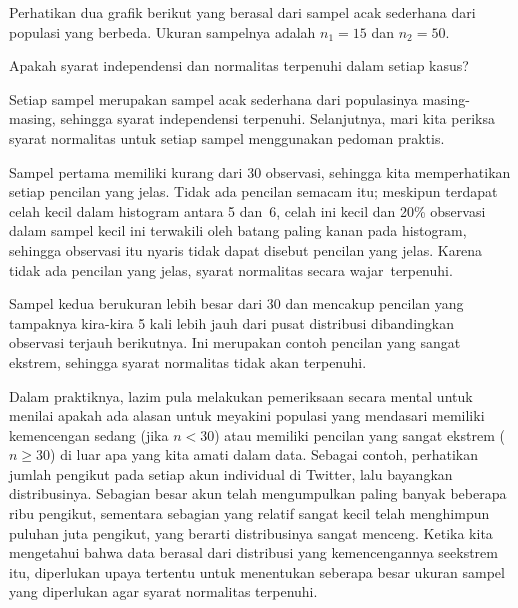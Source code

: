 \begin{examplewrap}
\begin{nexample}{Perhatikan dua grafik berikut
    yang berasal dari sampel acak sederhana dari
    populasi yang berbeda.
    Ukuran sampelnya adalah $n_1 = 15$ dan $n_2 = 50$.
    \begin{center}
    \end{center}
    Apakah syarat independensi dan normalitas terpenuhi
    dalam setiap kasus?}
  \label{outliers_and_ss_condition_ex}%
  Setiap sampel merupakan sampel acak sederhana dari
  populasinya masing-masing, sehingga syarat independensi
  terpenuhi.
  Selanjutnya, mari kita periksa syarat normalitas untuk
  setiap sampel menggunakan pedoman praktis.
  
  Sampel pertama memiliki kurang dari 30 observasi,
  sehingga kita memperhatikan setiap pencilan yang jelas.
  Tidak ada pencilan semacam itu; meskipun terdapat celah kecil dalam
  histogram antara 5 dan~6, celah ini kecil dan
  20\% observasi dalam sampel kecil ini
  terwakili oleh batang paling kanan pada histogram,
  sehingga observasi itu nyaris tidak dapat disebut pencilan yang jelas.
  Karena tidak ada pencilan yang jelas, syarat normalitas
  secara wajar~terpenuhi.

  Sampel kedua berukuran lebih besar dari 30 dan
  mencakup pencilan yang tampaknya kira-kira 5 kali
  lebih jauh dari pusat distribusi dibandingkan
  observasi terjauh berikutnya.
  Ini merupakan contoh pencilan yang sangat ekstrem,
  sehingga syarat normalitas tidak akan terpenuhi.
\end{nexample}
\end{examplewrap}

Dalam praktiknya, lazim pula melakukan pemeriksaan secara mental untuk menilai
apakah ada alasan untuk meyakini populasi yang mendasari
memiliki kemencengan sedang (jika $n < 30$)
atau memiliki pencilan yang sangat ekstrem ($n \geq 30$)
di luar apa yang kita amati dalam data.
Sebagai contoh, perhatikan jumlah pengikut
pada setiap akun individual di Twitter,
lalu bayangkan distribusinya.
Sebagian besar akun telah mengumpulkan
paling banyak beberapa ribu pengikut,
sementara sebagian yang relatif sangat kecil telah menghimpun
puluhan juta pengikut,
yang berarti distribusinya sangat menceng.
Ketika kita mengetahui bahwa data berasal dari distribusi
yang kemencengannya seekstrem itu,
diperlukan upaya tertentu untuk menentukan seberapa besar
ukuran sampel yang diperlukan agar syarat normalitas
terpenuhi.

